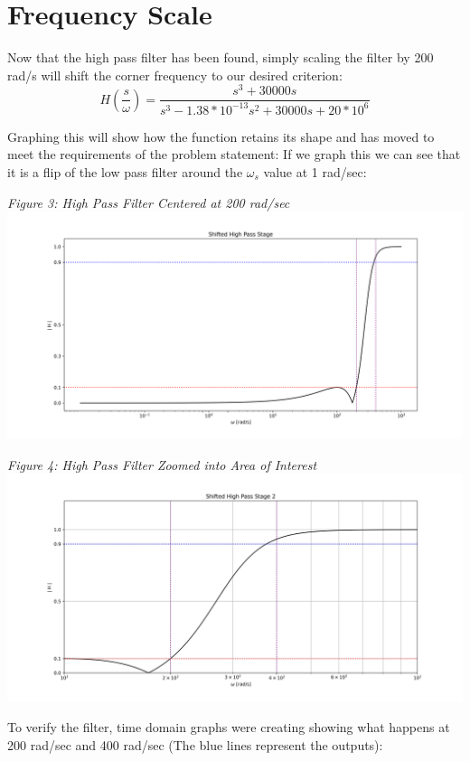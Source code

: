 \documentclass[12pt,a4paper]{article}
\begin{document}
	\section*{Frequency Scale}
	Now that the high pass filter has been found, simply scaling the filter by 200 rad/s will shift the corner frequency to our desired criterion: 
	$$H(\frac{s}{\omega})=\frac{s^3+30000s}{s^3-1.38*10^{-13}s^2+30000s+20*10^{6}}$$
	
	Graphing this will show how the function retains its shape and has moved to meet the requirements of the problem statement: 
	If we graph this we can see that it is a flip of the low pass filter around the $\omega_s$ value at 1 rad/sec:
	\begin{center}
		\textit{Figure 3: High Pass Filter Centered at 200 rad/sec }
		\includegraphics[width = 7in]{Figure_3.png} \vspace*{12pt}
		
		\textit{Figure 4: High Pass Filter Zoomed into Area of Interest}
		\includegraphics[width = 7in]{Figure_4.png} 
	\end{center}
	To verify the filter, time domain graphs were creating showing what happens at 200 rad/sec and 400 rad/sec (The blue lines represent the outputs):
	
\end{document}

